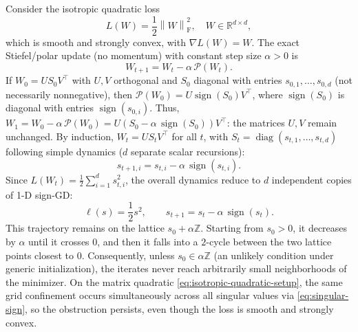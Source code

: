 \documentclass{article}
\theoremstyle{plain}
\theoremstyle{definition}
\theoremstyle{remark}
\newcommand{\R}{\mathbb{R}}
\newcommand{\Z}{\mathbb{Z}}
\newcommand{\loss}{L}
\newcommand{\stepsize}{\alpha}
\newcommand{\proj}{\mathcal{P}}
\newcommand{\sign}{\operatorname{sign}}
\newcommand{\diag}{\operatorname{diag}}
\newcommand{\Sv}{{S}} %
\newcommand{\sv}{{s}} %
\newcommand{\frob}[1]{\left\lVert #1 \right\rVert_{\mathrm{F}}}
\begin{document}
Consider the isotropic quadratic loss
\begin{equation}
  \loss(W) = \frac12 \frob{W}^2,
  \quad W\in\R^{d\times d},
  \label{eq:isotropic-quadratic-setup}
\end{equation}
which is smooth and strongly convex, with $\nabla \loss(W)=W$.
The exact Stiefel/polar update (no momentum) 
with constant step size $\stepsize>0$ 
is
\begin{equation}
  W_{t+1} = W_t - \stepsize\, \proj(W_t).
  \label{eq:exact-stiefel-update-setup}
\end{equation}
If $W_0 = U\Sv_0V^\top$ with $U, V$ orthogonal and $\Sv_0$ diagonal with entries $\sv_{0,1},\ldots,\sv_{0,d}$ (not necessarily nonnegative), then $\proj(W_0) = U \sign(\Sv_0) V^\top$, where $\sign(\Sv_0)$ is diagonal with entries $\sign(\sv_{0,i})$.
Thus, $W_1 = W_0 - \stepsize\,\proj(W_0) = U(\Sv_0 - \stepsize\,\sign(\Sv_0))V^\top$: the matrices $U, V$ remain unchanged.
By induction, $W_t = U \Sv_t V^\top$ for all $t$, with $\Sv_t = \diag(\sv_{t,1},\ldots,\sv_{t,d})$ following simple dynamics ($d$ separate scalar recursions):
\begin{equation}
  \sv_{t+1,i} = \sv_{t,i} - \stepsize\,\sign(\sv_{t,i}).
  \label{eq:singular-sign}
\end{equation}
Since $L(W_t) = \frac12 \sum_{i=1}^d \sv_{t,i}^2$,
the overall dynamics reduce to 
$d$ independent copies of 1-D sign-GD: 
\begin{equation}
  \ell(s)=\frac12 s^2,
  \qquad
  \sv_{t+1} = \sv_t - \stepsize\,\sign(\sv_t).
  \label{eq:1d-sign-setup}
\end{equation}
This trajectory remains on the lattice $\sv_0+\stepsize\Z$.
Starting from $\sv_0>0$, it decreases by $\stepsize$ until it crosses $0$, and then it falls into a $2$-cycle between the two lattice points closest to $0$.
Consequently, unless $\sv_0\in \stepsize\Z$ (an unlikely condition under generic initialization), 
the iterates never reach arbitrarily small neighborhoods of the minimizer. 
On the matrix quadratic \eqref{eq:isotropic-quadratic-setup}, the same grid confinement occurs simultaneously across all singular values via \eqref{eq:singular-sign}, so the obstruction persists, even though the loss is smooth and strongly convex. 
\end{document}
